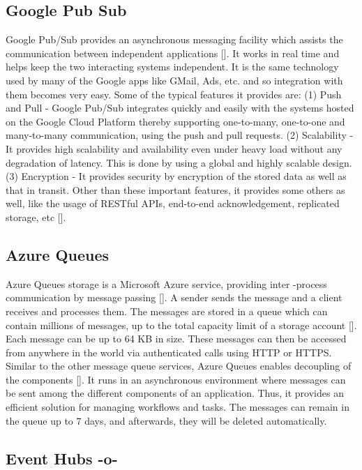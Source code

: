 \subsection{Google Pub Sub}

Google Pub/Sub provides an asynchronous messaging facility which
assists the communication between independent applications
 [\cite{www-google-pub-sub}]. It works in real time and helps keep the
two interacting systems independent. It is the same technology used by
many of the Google apps like GMail, Ads, etc. and so integration with
them becomes very easy.  Some of the typical features it provides are:
(1) Push and Pull - Google Pub/Sub integrates quickly and easily with
the systems hosted on the Google Cloud Platform thereby supporting
one-to-many, one-to-one and many-to-many communication, using the push
and pull requests. (2) Scalability - It provides high scalability and
availability even under heavy load without any degradation of
latency. This is done by using a global and highly scalable
design. (3) Encryption - It provides security by encryption of the
stored data as well as that in transit. Other than these important
features, it provides some others as well, like the usage of RESTful
APIs, end-to-end acknowledgement, replicated storage,
etc [\cite{www-google-pub-sub-features}].
     
\subsection{Azure Queues}

Azure Queues storage is a Microsoft Azure service, providing inter
-process communication by message
passing [\cite{silberschatz1998operating}].  A sender sends the message
and a client receives and processes them.  The messages are stored in
a queue which can contain millions of messages, up to the total
capacity limit of a storage account [\cite{www-azurequeue-web}].  Each
message can be up to 64 KB in size. These messages can then be
accessed from anywhere in the world via authenticated calls using HTTP
or HTTPS. Similar to the other message queue services, Azure Queues
enables decoupling of the components [\cite{www-tutorialspoint}]. It
runs in an asynchronous environment where messages can be sent among
the different components of an application. Thus, it provides an
efficient solution for managing workflows and tasks. The messages can
remain in the queue up to 7 days, and afterwards, they will be deleted
automatically.

\subsection{Event Hubs -o-}

